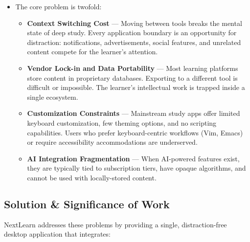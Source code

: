 \documentclass[14pt]{article}
\begin{document}
\begin{itemize}
\item The core problem is twofold:
\begin{itemize}
\item \textbf{\textbf{Context Switching Cost}} — Moving between tools breaks the mental
state of deep study. Every application boundary is an opportunity
for distraction: notifications, advertisements, social features, and
unrelated content compete for the learner's attention.

\item \textbf{\textbf{Vendor Lock-in and Data Portability}} — Most learning platforms
store content in proprietary databases. Exporting to a different
tool is difficult or impossible. The learner's intellectual work is
trapped inside a single ecosystem.

\item \textbf{\textbf{Customization Constraints}} — Mainstream study apps offer limited
keyboard customization, few theming options, and no scripting
capabilities. Users who prefer keyboard-centric workflows (Vim,
Emacs) or require accessibility accommodations are underserved.

\item \textbf{\textbf{AI Integration Fragmentation}} — When AI-powered features exist,
they are typically tied to subscription tiers, have opaque
algorithms, and cannot be used with locally-stored content.
\end{itemize}
\end{itemize}

\newpage
\subsection{Solution \& Significance of Work}
\label{sec:orgdea4246}
NextLearn addresses these problems by providing a single, distraction-free
desktop application that integrates:
\end{document}
